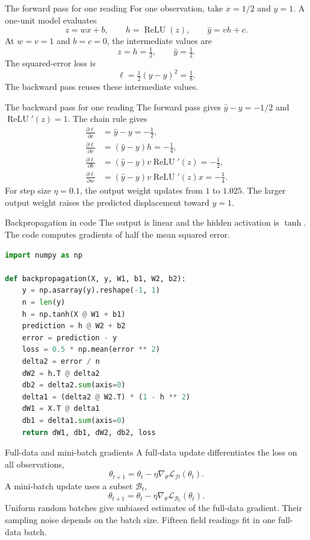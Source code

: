 \documentclass[aspectratio=169]{beamer}
\DeclareMathOperator{\ReLU}{ReLU}
\begin{document}
\begin{frame}{The forward pass for one reading}
For one observation, take $x=1/2$ and $y=1$.
A one-unit model evaluates
\[
z=wx+b,\qquad h=\ReLU(z),\qquad \hat y=vh+c.
\]
At $w=v=1$ and $b=c=0$, the intermediate values are
\[
z=h=\tfrac12,\qquad \hat y=\tfrac12.
\]
The squared-error loss is
\[
\ell=\tfrac12(\hat y-y)^2=\tfrac18.
\]
The backward pass reuses these intermediate values.
\end{frame}

\begin{frame}{The backward pass for one reading}
The forward pass gives $\hat y-y=-1/2$ and $\ReLU'(z)=1$.
The chain rule gives
\begin{align*}
\frac{\partial\ell}{\partial c}&=\hat y-y=-\tfrac12,\\
\frac{\partial\ell}{\partial v}&=(\hat y-y)h=-\tfrac14,\\
\frac{\partial\ell}{\partial b}&=(\hat y-y)v\ReLU'(z)=-\tfrac12,\\
\frac{\partial\ell}{\partial w}&=(\hat y-y)v\ReLU'(z)x=-\tfrac14.
\end{align*}
For step size $\eta=0.1$, the output weight updates from $1$ to $1.025$.
The larger output weight raises the predicted displacement toward $y=1$.
\end{frame}

\begin{frame}[fragile]{Backpropagation in code}
The output is linear and the hidden activation is $\tanh$.
The code computes gradients of half the mean squared error.
\begin{lstlisting}[language=Python]
import numpy as np

def backpropagation(X, y, W1, b1, W2, b2):
    y = np.asarray(y).reshape(-1, 1)
    n = len(y)
    h = np.tanh(X @ W1 + b1)
    prediction = h @ W2 + b2
    error = prediction - y
    loss = 0.5 * np.mean(error ** 2)
    delta2 = error / n
    dW2 = h.T @ delta2
    db2 = delta2.sum(axis=0)
    delta1 = (delta2 @ W2.T) * (1 - h ** 2)
    dW1 = X.T @ delta1
    db1 = delta1.sum(axis=0)
    return dW1, db1, dW2, db2, loss
\end{lstlisting}
\end{frame}

\begin{frame}{Full-data and mini-batch gradients}
A full-data update differentiates the loss on all observations,
\[
\theta_{t+1}=\theta_t-\eta\nabla_\theta\mathcal L_{\mathcal D}(\theta_t).
\]
A mini-batch update uses a subset $\mathcal B_t$,
\[
\theta_{t+1}=\theta_t-\eta\nabla_\theta\mathcal L_{\mathcal B_t}(\theta_t).
\]
Uniform random batches give unbiased estimates of the full-data gradient.
Their sampling noise depends on the batch size.
Fifteen field readings fit in one full-data batch.
\end{frame}
\end{document}

